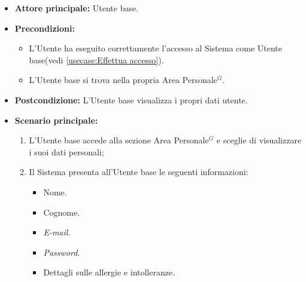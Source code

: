 \label{usecase:Visualizzazione e modifica dati utente}
\begin{itemize}
	\item \textbf{Attore principale:} Utente base.

	\item \textbf{Precondizioni:}
	\begin{itemize}
        \item L'Utente ha eseguito correttamente l'accesso al Sistema come Utente base(vedi \autoref{usecase:Effettua accesso}).
        \item L'Utente base si trova nella propria Area Personale$^G$.
    \end{itemize}

	\item \textbf{Postcondizione:} L'Utente base visualizza i propri dati utente.

	\item \textbf{Scenario principale:}
	      \begin{enumerate}
		      \item L'Utente base accede alla sezione Area Personale$^G$ e sceglie di visualizzare i suoi dati personali;
		      \item Il Sistema presenta all'Utente base le seguenti informazioni:
              \begin{itemize}
                \item Nome.
                \item Cognome.
                \item \textit{E-mail}.
                \item \textit{Password}.
                \item Dettagli sulle allergie e intolleranze.
              \end{itemize}
	      \end{enumerate}
\end{itemize}
